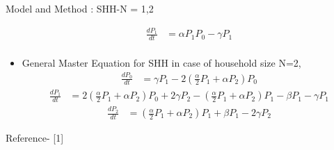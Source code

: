 \documentclass[smaller,aspectratio=169, toc=bibliography]{beamer}
\begin{document}
\begin{frame}[fragile]{Model and Method : SHH-N = 1,2}
\begin{itemize}
	\begin{equation*}
		\begin{aligned}
			{\frac{dP_1}{dt}} & = \alpha P_{1} P_{0} - \gamma P_{1} \\
		\end{aligned}
	\end{equation*}
	\item General Master Equation for SHH in case of household size N=2,
\begin{equation*}
	\begin{aligned}
		{\frac{dP_0}{dt}} & = \gamma P_{1} - 2 (\frac{\alpha}{2}P_{1} + \alpha P_{2}) P_{0}					
	\end{aligned}
\end{equation*}
\begin{equation*}
	\begin{aligned}
		{\frac{dP_1}{dt}} & =2 (\frac{\alpha}{2}P_{1} + \alpha P_{2}) P_{0} + 2 \gamma P_{2} - (\frac{\alpha}{2}P_{1} + \alpha P_{2}) P_{1} - \beta P_{1} - \gamma P_{1}
	\end{aligned}
\end{equation*}
\begin{equation*}
	\begin{aligned}
		{\frac{dP_2}{dt}} & = (\frac{\alpha}{2}P_{1} + \alpha P_{2}) P_{1} + \beta  P_{1} - 2 \gamma P_{2}
	\end{aligned}
\end{equation*} 

\end{itemize}
\tiny{Reference- [1]}
\end{frame}
\end{document}

